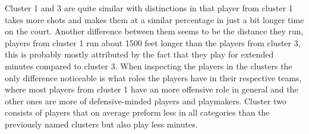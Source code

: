 \documentclass{article}
\begin{document}
\begin{table}[h]
\centering
{}
\caption{Cluster lables and typical players} 
\end{table}

Cluster 1 and 3 are quite similar with distinctions in that player from cluster 1 takes more shots and makes them at a similar percentage in just a bit longer time on the court. Another difference between them seems to be the distance they run, players from cluster 1 run about 1500 feet longer than the players from cluster 3, this is probably mostly attributed by the fact that they play for extended minutes compared to cluster 3. When inspecting the players in the clusters the only difference noticeable is what roles the players have in their respective teams, where most players from cluster 1 have an more offensive role in general and the other ones are more of defensive-minded players and playmakers. Cluster two consists of players that on average preform less in all categories than the previously named clusters but also play less minutes.
\end{document}
